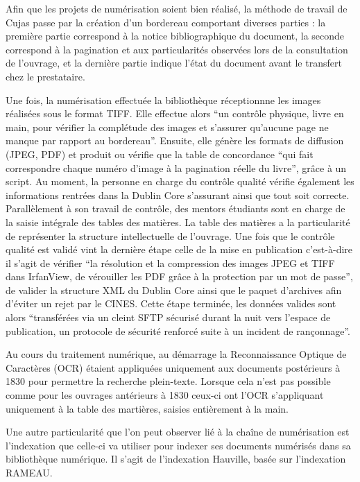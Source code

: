 Afin que les projets de numérisation soient bien réalisé, la méthode de travail de Cujas passe par la création d'un bordereau comportant diverses parties : la première partie correspond à la notice bibliographique du document, la seconde correspond à la pagination et aux particularités observées lors de la consultation de l'ouvrage, et la dernière partie indique l'état du document avant le transfert chez le prestataire.

Une fois, la numérisation effectuée la bibliothèque réceptionnne les images réalisées sous le format TIFF. Elle effectue alors \enquote{un contrôle physique, livre en main, pour vérifier la complétude des images et s'assurer qu'aucune page ne manque par rapport au bordereau}. Ensuite, elle génère les formats de diffusion (JPEG, PDF) et produit ou vérifie que la table de concordance \enquote{qui fait correspondre chaque numéro d'image à la pagination réelle du livre}, grâce à un script. Au moment, la personne en charge du contrôle qualité vérifie également les informations rentrées dans la Dublin Core s'assurant ainsi que tout soit correcte. Parallèlement à son travail de contrôle, des mentors étudiants sont en charge de la saisie intégrale des tables des matières. La table des matières a la particularité de représenter la structure intellectuelle de l'ouvrage. Une fois que le contrôle qualité est validé vint la dernière étape celle de la mise en publication c'est-à-dire il s'agit de vérifier \enquote{la résolution et la compression des images JPEG et TIFF dans IrfanView, de vérouiller les PDF grâce à la protection par un mot de passe}, de valider la structure XML du Dublin Core ainsi que le paquet d'archives afin d'éviter un rejet par le CINES. Cette étape terminée, les données valides sont alors \enquote{transférées via un cleint SFTP sécurisé durant la nuit vers l'espace de publication, un protocole de sécurité renforcé suite à un incident de rançonnage}. 

Au cours du traitement numérique, au démarrage la Reconnaissance Optique de Caractères (OCR) étaient appliquées uniquement aux documents postérieurs à 1830 pour permettre la recherche plein-texte. Lorsque cela n'est pas possible comme pour les ouvrages antérieurs à 1830 ceux-ci ont l'OCR s'appliquant uniquement à la table des martières, saisies entièrement à la main. 

Une autre particularité que l'on peut observer lié à la chaîne de numérisation est l'indexation que celle-ci va utiliser pour indexer ses documents numérisés dans sa bibliothèque numérique. Il s'agit de l'indexation Hauville, basée sur l'indexation RAMEAU.